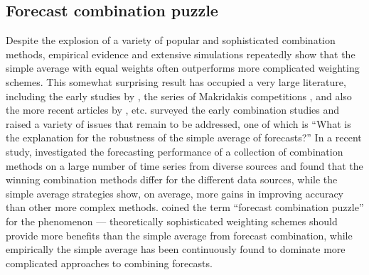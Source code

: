 \documentclass[11pt]{article}
\begin{document}
\subsection{Forecast combination puzzle}
\label{sec:puzzle}

Despite the explosion of a variety of popular and sophisticated combination methods, empirical evidence and extensive simulations repeatedly show that the simple average with equal weights often outperforms more complicated weighting schemes. This somewhat surprising result has occupied a very large literature, including the early studies by \citet{Stock1998-np,Stock2003-sp,Stock2004-rq}, the series of Makridakis competitions \citep{Makridakis1982-hb,Makridakis2000-he,Makridakis2020-hu}, and also the more recent articles by \citet{Blanc2016-sn,Blanc2020-pg}, etc. \citet{Clemen1989-fb} surveyed the early combination studies and raised a variety of issues that remain to be addressed, one of which is ``What is the explanation for the robustness of the simple average of forecasts?'' In a recent study, \citet{Gastinger2021-ey} investigated the forecasting performance of a collection of combination methods on a large number of time series from diverse sources and found that the winning combination methods differ for the different data sources, while the simple average strategies show, on average, more gains in improving accuracy than other more complex methods. \citet{Stock2004-rq} coined the term ``forecast combination puzzle'' for the phenomenon --- theoretically sophisticated weighting schemes should provide more benefits than the simple average from forecast combination, while empirically the simple average has been continuously found to dominate more complicated approaches to combining forecasts.
\end{document}

